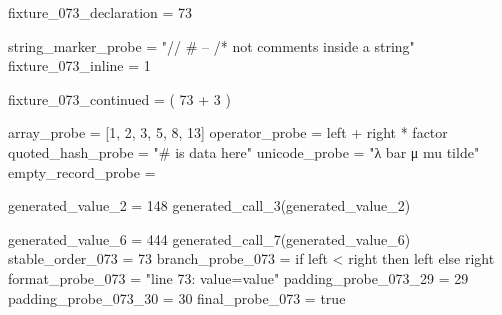 fixture_073_declaration = 73

string_marker_probe = "// # -- /* not comments inside a string"
fixture_073_inline = 1 %

fixture_073_continued = (
    73 + 3
)

array_probe = [1, 2, 3, 5, 8, 13]
operator_probe = left + right * factor
quoted_hash_probe = "# is data here" %
unicode_probe = "λ bar μ mu tilde"
empty_record_probe = {}


generated_value_2 = 148
generated_call_3(generated_value_2)

generated_value_6 = 444
generated_call_7(generated_value_6)
stable_order_073 = 73
branch_probe_073 = if left < right then left else right
format_probe_073 = "line 73: value={value}"
padding_probe_073_29 = 29
padding_probe_073_30 = 30
final_probe_073 = true
